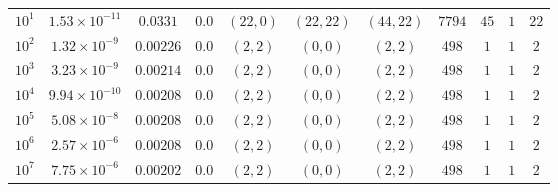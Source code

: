 \begin{tabular}{l c c c c c c c c c c}
$10^1$  &  $1.53 \times 10^{-11}$  &  $0.0331$  &  $0.0$  &  $(22, 0)$  &  $(22, 22)$  &  $(44, 22)$  &  $7794$  &  $45$  &  $1$  &  $22$\\ 
$10^2$  &  $1.32 \times 10^{-9}$  &  $0.00226$  &  $0.0$  &  $(2, 2)$  &  $(0, 0)$  &  $(2, 2)$  &  $498$  &  $1$  &  $1$  &  $2$\\ 
$10^3$  &  $3.23 \times 10^{-9}$  &  $0.00214$  &  $0.0$  &  $(2, 2)$  &  $(0, 0)$  &  $(2, 2)$  &  $498$  &  $1$  &  $1$  &  $2$\\ 
$10^4$  &  $9.94 \times 10^{-10}$  &  $0.00208$  &  $0.0$  &  $(2, 2)$  &  $(0, 0)$  &  $(2, 2)$  &  $498$  &  $1$  &  $1$  &  $2$\\ 
$10^5$  &  $5.08 \times 10^{-8}$  &  $0.00208$  &  $0.0$  &  $(2, 2)$  &  $(0, 0)$  &  $(2, 2)$  &  $498$  &  $1$  &  $1$  &  $2$\\ 
$10^6$  &  $2.57 \times 10^{-6}$  &  $0.00208$  &  $0.0$  &  $(2, 2)$  &  $(0, 0)$  &  $(2, 2)$  &  $498$  &  $1$  &  $1$  &  $2$\\ 
$10^7$  &  $7.75 \times 10^{-6}$  &  $0.00202$  &  $0.0$  &  $(2, 2)$  &  $(0, 0)$  &  $(2, 2)$  &  $498$  &  $1$  &  $1$  &  $2$\\ 

\end{tabular}
